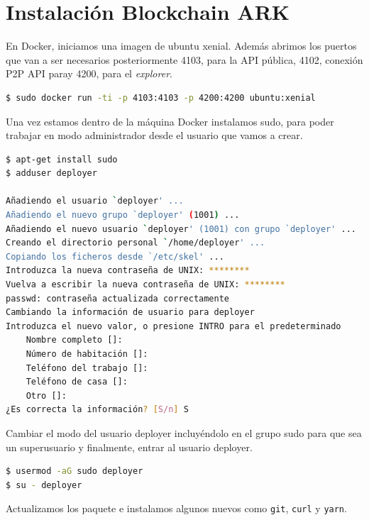 \section{Instalación Blockchain ARK}

En Docker, iniciamos una imagen de ubuntu xenial. Además abrimos los puertos que van a ser necesarios posteriormente 4103, para la API pública, 4102, conexión P2P API paray 4200, para el \textit{explorer}.\\

\begin{lstlisting}[language=Bash,caption=Instalación \textit{blockchain}. Parte I, label=cod:run-docker, style=Consola]
$ sudo docker run -ti -p 4103:4103 -p 4200:4200 ubuntu:xenial
\end{lstlisting}

Una vez estamos dentro de la máquina Docker instalamos sudo, para poder trabajar en modo administrador desde el usuario que vamos a crear.\\

\begin{lstlisting}[language=Bash,caption=Instalación \textit{blockchain}. Parte II, label=cod:add-user, style=Consola]
$ apt-get install sudo
$ adduser deployer

Añadiendo el usuario `deployer' ...
Añadiendo el nuevo grupo `deployer' (1001) ...
Añadiendo el nuevo usuario `deployer' (1001) con grupo `deployer' ...
Creando el directorio personal `/home/deployer' ...
Copiando los ficheros desde `/etc/skel' ...
Introduzca la nueva contraseña de UNIX: ********
Vuelva a escribir la nueva contraseña de UNIX: ********
passwd: contraseña actualizada correctamente
Cambiando la información de usuario para deployer
Introduzca el nuevo valor, o presione INTRO para el predeterminado
	Nombre completo []: 
	Número de habitación []: 
	Teléfono del trabajo []: 
	Teléfono de casa []: 
	Otro []: 
¿Es correcta la información? [S/n] S
\end{lstlisting}

Cambiar el modo del usuario deployer incluyéndolo en el grupo sudo para que sea un superusuario y finalmente, entrar al usuario deployer.\\

\begin{lstlisting}[language=Bash,caption=Instalación \textit{blockchain}. Parte III, label=cod:enter-user, style=Consola]
$ usermod -aG sudo deployer
$ su - deployer
\end{lstlisting}

Actualizamos los paquete e instalamos algunos nuevos como \texttt{git}, \texttt{curl} y \texttt{yarn}.\\

